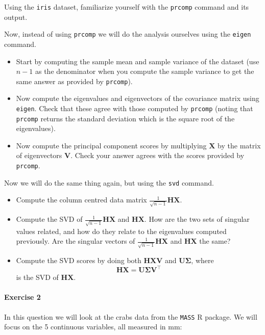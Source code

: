 \documentclass[
]{book}
\providecommand{\tightlist}{%
  \setlength{\itemsep}{0pt}\setlength{\parskip}{0pt}}
\theoremstyle{definition}
\theoremstyle{definition}
\theoremstyle{definition}
\theoremstyle{definition}
\theoremstyle{remark}
\begin{document}
Using the \texttt{iris} dataset, familiarize yourself with the \texttt{prcomp} command and its output.

Now, instead of using \texttt{prcomp} we will do the analysis ourselves using the \texttt{eigen} command.

\begin{itemize}
\tightlist
\item
  Start by computing the sample mean and sample variance of the dataset (use \(n-1\) as the denominator when you compute the sample variance to get the same answer as provided by \texttt{prcomp}).
\item
  Now compute the eigenvalues and eigenvectors of the covariance matrix using \texttt{eigen}. Check that these agree with those computed by \texttt{prcomp} (noting that \texttt{prcomp} returns the standard deviation which is the square root of the eigenvalues).
\item
  Now compute the principal component scores by multiplying \(\mathbf X\) by the matrix of eigenvectors \(\mathbf V\). Check your answer agrees with the scores provided by \texttt{prcomp}.
\end{itemize}

Now we will do the same thing again, but using the \texttt{svd} command.

\begin{itemize}
\item
  Compute the column centred data matrix \(\frac{1}{\sqrt{n-1}}\mathbf H\mathbf X\).
\item
  Compute the SVD of \(\frac{1}{\sqrt{n-1}}\mathbf H\mathbf X\) and \(\mathbf H\mathbf X\). How are the two sets of singular values related, and how do they relate to the eigenvalues computed previously.
  Are the singular vectors of \(\frac{1}{\sqrt{n-1}}\mathbf H\mathbf X\) and \(\mathbf H\mathbf X\) the same?
\item
  Compute the SVD scores by doing both \(\mathbf H\mathbf X\mathbf V\) and \(\mathbf U\boldsymbol{\Sigma}\), where
  \[\mathbf H\mathbf X= \mathbf U\boldsymbol{\Sigma}\mathbf V^\top\]
  is the SVD of \(\mathbf H\mathbf X\).
\end{itemize}

\hypertarget{exercise-2}{%
\paragraph*{Exercise 2}\label{exercise-2}}

In this question we will look at the crabs data from the \texttt{MASS} R package.
We will focus on the 5 continuous variables, all measured in mm:
\end{document}
